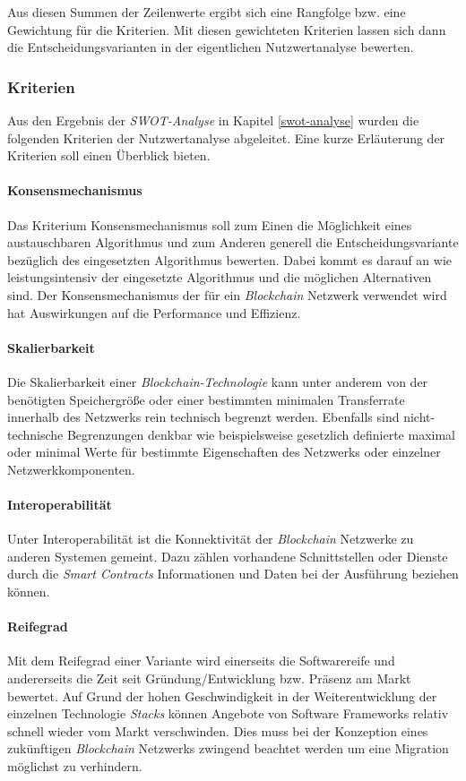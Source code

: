 Aus diesen Summen der Zeilenwerte ergibt sich eine Rangfolge bzw. eine Gewichtung für die Kriterien. Mit diesen gewichteten Kriterien lassen sich dann die Entscheidungsvarianten in der eigentlichen Nutzwertanalyse bewerten.

\subsubsection{Kriterien}
Aus den Ergebnis der \textit{SWOT-Analyse} in Kapitel \ref{swot-analyse} wurden die folgenden Kriterien der Nutzwertanalyse abgeleitet. Eine kurze Erläuterung der Kriterien soll einen Überblick bieten.

\paragraph{Konsensmechanismus}
Das Kriterium Konsensmechanismus soll zum Einen die Möglichkeit eines austauschbaren Algorithmus und zum Anderen generell die Entscheidungsvariante bezüglich des eingesetzten Algorithmus bewerten. Dabei kommt es darauf an wie leistungsintensiv der eingesetzte Algorithmus und die möglichen Alternativen sind. Der Konsensmechanismus der für ein \textit{Blockchain} Netzwerk verwendet wird hat Auswirkungen auf die Performance und Effizienz.

\paragraph{Skalierbarkeit}
Die Skalierbarkeit einer \textit{Blockchain-Technologie} kann unter anderem von der benötigten Speichergröße oder einer bestimmten minimalen Transferrate innerhalb des Netzwerks rein technisch begrenzt werden. Ebenfalls sind nicht-technische Begrenzungen denkbar wie beispielsweise gesetzlich definierte maximal oder minimal Werte für bestimmte Eigenschaften des Netzwerks oder einzelner Netzwerkkomponenten.

\paragraph{Interoperabilität}
Unter Interoperabilität ist die Konnektivität der \textit{Blockchain} Netzwerke zu anderen Systemen gemeint. Dazu zählen vorhandene Schnittstellen oder Dienste durch die \textit{Smart Contracts} Informationen und Daten bei der Ausführung beziehen können.

\paragraph{Reifegrad}
Mit dem Reifegrad einer Variante wird einerseits die Softwarereife und andererseits die Zeit seit Gründung/Entwicklung bzw. Präsenz am Markt bewertet. Auf Grund der hohen Geschwindigkeit in der Weiterentwicklung der einzelnen Technologie \textit{Stacks} können Angebote von Software Frameworks relativ schnell wieder vom Markt verschwinden. Dies muss bei der Konzeption eines zukünftigen \textit{Blockchain} Netzwerks zwingend beachtet werden um eine Migration möglichst zu verhindern.

